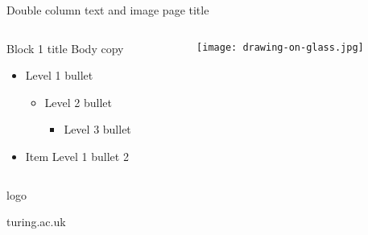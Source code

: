 \documentclass[t]{beamer}
\begin{document}
\begin{frame}{Double column text and image page title}
	\begin{columns}[T,totalwidth=\textwidth]
  		\begin{column}{0.45\textwidth}
  			\begin{block}{Block 1 title}
    				Body copy
    				\begin{itemize}    
    					\item Level 1 bullet
  					\begin{itemize}
  						\item Level 2 bullet
  						\begin{itemize}
  							\item Level 3 bullet
  						\end{itemize}
  					\end{itemize}
    					\item Item Level 1 bullet 2
    				\end{itemize}  
			\end{block}
  		\end{column} %
  		\begin{column}{0.45\textwidth}
			\vspace{-1.5\frametitlesize}
			\begin{figure}
				\texttt{[image: drawing-on-glass.jpg]}
			\end{figure}
  		\end{column}%
	\end{columns}
\end{frame}

\begin{frame}	
		\paperheight
		\begin{beamercolorbox}[wd=\textwidth,leftskip=0\textwidth,sep=0px]{logo}
    		\end{beamercolorbox}%
		\gridblock
    		\begin{beamercolorbox}[wd=0.45\textwidth,leftskip=0\textwidth,sep=0px]{}
			turing.ac.uk\par{}
    		\end{beamercolorbox}%
\end{frame}
\end{document}
